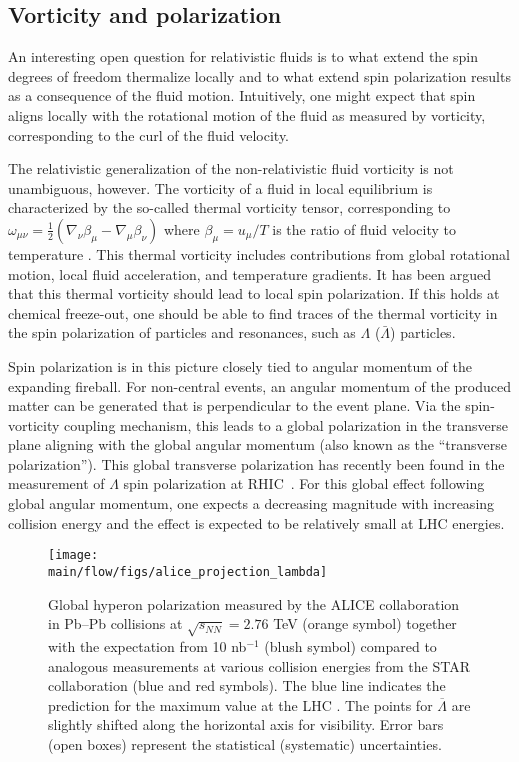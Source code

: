 \subsection{Vorticity and polarization}

An interesting open question for relativistic fluids is to what extend the spin degrees of freedom thermalize locally and to what extend spin polarization results as a consequence of the fluid motion. Intuitively, one might expect that spin aligns locally with the rotational motion of the fluid as measured by vorticity, corresponding to the curl of the fluid velocity.

The relativistic generalization of the non-relativistic fluid vorticity is not unambiguous, however. The vorticity of a fluid in local equilibrium is characterized by the so-called thermal vorticity tensor, corresponding to $\omega_{\mu\nu} = \frac{1}{2} (\nabla_\nu \beta_\mu - \nabla_\mu \beta_\nu)$ where $\beta_\mu=u_\mu / T$ is the ratio of fluid velocity to temperature \cite{Becattini:2013fla}. This thermal vorticity includes contributions from global rotational motion, local fluid acceleration, and temperature gradients. It has been argued that this thermal vorticity should lead to local spin polarization. If this holds at chemical freeze-out, one should be able to find traces of the thermal vorticity in the spin polarization of particles and resonances, such as $\Lambda$ ($\bar{\Lambda}$) particles.

Spin polarization is in this picture closely tied to angular momentum of the expanding fireball. For non-central events, an angular momentum of the produced matter can be generated that is perpendicular to the event plane. Via the spin-vorticity coupling mechanism, this leads to a global polarization in the transverse plane aligning with the global angular momentum (also known as the ``transverse polarization''). This global transverse polarization has recently been found in the measurement of $\Lambda$ spin polarization at RHIC~\cite{STAR:2017ckg}. For this global effect following global angular momentum, one expects a decreasing magnitude with increasing collision energy and the effect is expected to be relatively small at LHC energies. 

\begin{figure*}[!htb]
\begin{center}
\texttt{[image: \\main/flow/figs/alice\_projection\_lambda]}
\caption{Global hyperon polarization measured by the ALICE collaboration in Pb--Pb collisions at $\sqrt{s_{NN}}=2.76$ TeV (orange symbol) together with the expectation from 10 nb$^{-1}$ (blush symbol) compared to analogous measurements at various collision energies from the STAR collaboration \cite{STAR:2017ckg, Abelev:2007zk} (blue and red symbols). The blue line indicates the prediction for the maximum value at the LHC \cite{Voloshin:ICPPA2}. The points for $\overline{\Lambda}$ are slightly shifted along the horizontal axis for visibility.  Error bars (open boxes) represent the statistical (systematic) uncertainties.}
\label{fig:alice_lambda}
\end{center}
\end{figure*}

